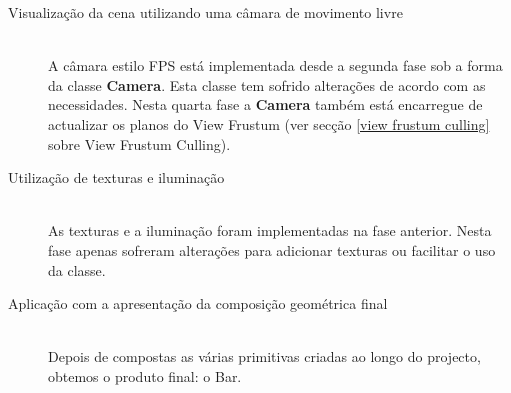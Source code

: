 \documentclass[a5paper,onecolumn, 11pt]{article}
\begin{document}
\begin{description}
	\item[Visualização da cena utilizando uma câmara de movimento livre] \hfill \\
	A câmara estilo FPS está implementada desde a segunda fase sob a forma da classe \textbf{Camera}. Esta classe tem sofrido alterações de acordo com as necessidades. Nesta quarta fase a \textbf{Camera} também está encarregue de actualizar os planos do View Frustum (ver secção \ref{view frustum culling} sobre View Frustum Culling).
	
	\item[Utilização de texturas e iluminação] \hfill \\
	As texturas e a iluminação foram implementadas na fase anterior. Nesta fase apenas sofreram alterações para adicionar texturas ou facilitar o uso da classe.
	
	\item[Aplicação com a apresentação da composição geométrica final] \hfill \\
	Depois de compostas as várias primitivas criadas ao longo do projecto, obtemos o produto final: o Bar.
\end{description}
\end{document}
